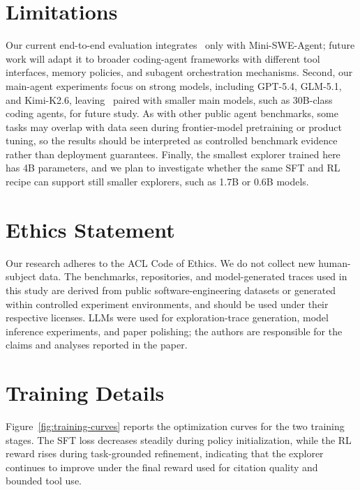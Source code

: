 \documentclass{llmxive}
\providecommand{\approach}{~}
\begin{document}
\section*{Limitations}
Our current end-to-end evaluation integrates \approach only with Mini-SWE-Agent; future work will adapt it to broader coding-agent frameworks with different tool interfaces, memory policies, and subagent orchestration mechanisms.
Second, our main-agent experiments focus on strong models, including GPT-5.4, GLM-5.1, and Kimi-K2.6, leaving \approach paired with smaller main models, such as 30B-class coding agents, for future study.
As with other public agent benchmarks, some tasks may overlap with data seen during frontier-model pretraining or product tuning, so the results should be interpreted as controlled benchmark evidence rather than deployment guarantees.
Finally, the smallest explorer trained here has 4B parameters, and we plan to investigate whether the same SFT and RL recipe can support still smaller explorers, such as 1.7B or 0.6B models.

\section*{Ethics Statement}
Our research adheres to the ACL Code of Ethics. We do not collect new human-subject data. The benchmarks, repositories, and model-generated traces used in this study are derived from public software-engineering datasets or generated within controlled experiment environments, and should be used under their respective licenses. LLMs were used for exploration-trace generation, model inference experiments, and paper polishing; the authors are responsible for the claims and analyses reported in the paper.
 






\appendix


\section{Training Details}
\label{app:training-details}

Figure~\ref{fig:training-curves} reports the optimization curves for the two training stages.
The SFT loss decreases steadily during policy initialization, while the RL reward rises during task-grounded refinement, indicating that the explorer continues to improve under the final reward used for citation quality and bounded tool use.
\end{document}
